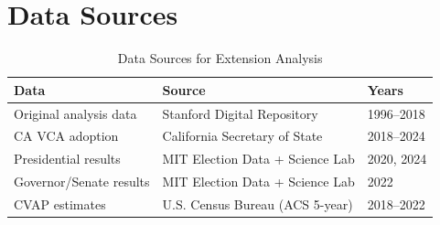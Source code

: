 \documentclass[12pt]{article}
\begin{document}
\section{Data Sources}

\begin{table}[H]
\centering
\caption{Data Sources for Extension Analysis}
\label{tab:data_sources}
\begin{tabular}{lll}
\toprule
Data & Source & Years \\
\midrule
Original analysis data & Stanford Digital Repository & 1996--2018 \\
CA VCA adoption & California Secretary of State & 2018--2024 \\
Presidential results & MIT Election Data + Science Lab & 2020, 2024 \\
Governor/Senate results & MIT Election Data + Science Lab & 2022 \\
CVAP estimates & U.S. Census Bureau (ACS 5-year) & 2018--2022 \\
\bottomrule
\end{tabular}
\end{table}
\end{document}
